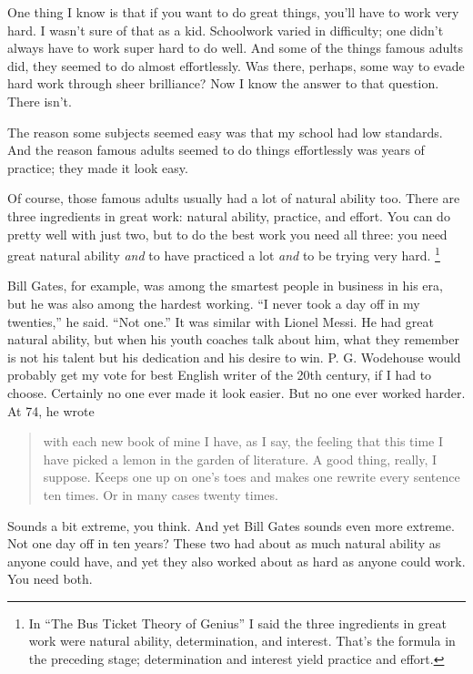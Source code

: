 \documentclass[12pt]{book}
\begin{document}
One thing I know is that if you want to do great things, you'll have to
work very hard. I wasn't sure of that as a kid. Schoolwork varied in
difficulty; one didn't always have to work super hard to do well. And
some of the things famous adults did, they seemed to do almost
effortlessly. Was there, perhaps, some way to evade hard work through
sheer brilliance? Now I know the answer to that question. There isn't.

The reason some subjects seemed easy was that my school had low
standards. And the reason famous adults seemed to do things effortlessly
was years of practice; they made it look easy.

Of course, those famous adults usually had a lot of natural ability too.
There are three ingredients in great work: natural ability, practice,
and effort. You can do pretty well with just two, but to do the best
work you need all three: you need great natural ability \emph{and} to
have practiced a lot \emph{and} to be trying very hard.
\footnote{In ``The Bus Ticket Theory of Genius'' I said the three
ingredients in great work were natural ability, determination, and
interest. That's the formula in the preceding stage; determination and
interest yield practice and effort.}

Bill Gates, for example, was among the smartest people in business in
his era, but he was also among the hardest working. ``I never took a day
off in my twenties,'' he said. ``Not one.'' It was similar with Lionel
Messi. He had great natural ability, but when his youth coaches talk
about him, what they remember is not his talent but his dedication and
his desire to win. P. G. Wodehouse would probably get my vote for best
English writer of the 20th century, if I had to choose. Certainly no one
ever made it look easier. But no one ever worked harder. At 74, he wrote

\begin{quote}
with each new book of mine I have, as I say, the feeling that this time
I have picked a lemon in the garden of literature. A good thing, really,
I suppose. Keeps one up on one's toes and makes one rewrite every
sentence ten times. Or in many cases twenty times.
\end{quote}

Sounds a bit extreme, you think. And yet Bill Gates sounds even more
extreme. Not one day off in ten years? These two had about as much
natural ability as anyone could have, and yet they also worked about as
hard as anyone could work. You need both.
\end{document}
